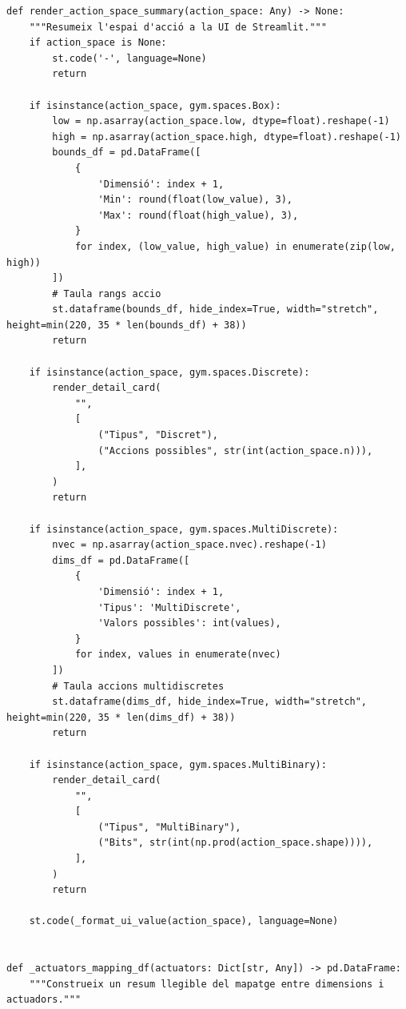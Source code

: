 \documentclass[10pt,a4paper]{article}
\begin{document}
\begin{lstlisting}[style=studioPython,caption={pages/Mostrar\_Entorn.py},label={lst:pages-mostrar-entorn-py}]
def render_action_space_summary(action_space: Any) -> None:
    """Resumeix l'espai d'acció a la UI de Streamlit."""
    if action_space is None:
        st.code('-', language=None)
        return

    if isinstance(action_space, gym.spaces.Box):
        low = np.asarray(action_space.low, dtype=float).reshape(-1)
        high = np.asarray(action_space.high, dtype=float).reshape(-1)
        bounds_df = pd.DataFrame([
            {
                'Dimensió': index + 1,
                'Min': round(float(low_value), 3),
                'Max': round(float(high_value), 3),
            }
            for index, (low_value, high_value) in enumerate(zip(low, high))
        ])
        # Taula rangs accio
        st.dataframe(bounds_df, hide_index=True, width="stretch", height=min(220, 35 * len(bounds_df) + 38))
        return

    if isinstance(action_space, gym.spaces.Discrete):
        render_detail_card(
            "",
            [
                ("Tipus", "Discret"),
                ("Accions possibles", str(int(action_space.n))),
            ],
        )
        return

    if isinstance(action_space, gym.spaces.MultiDiscrete):
        nvec = np.asarray(action_space.nvec).reshape(-1)
        dims_df = pd.DataFrame([
            {
                'Dimensió': index + 1,
                'Tipus': 'MultiDiscrete',
                'Valors possibles': int(values),
            }
            for index, values in enumerate(nvec)
        ])
        # Taula accions multidiscretes
        st.dataframe(dims_df, hide_index=True, width="stretch", height=min(220, 35 * len(dims_df) + 38))
        return

    if isinstance(action_space, gym.spaces.MultiBinary):
        render_detail_card(
            "",
            [
                ("Tipus", "MultiBinary"),
                ("Bits", str(int(np.prod(action_space.shape)))),
            ],
        )
        return

    st.code(_format_ui_value(action_space), language=None)


def _actuators_mapping_df(actuators: Dict[str, Any]) -> pd.DataFrame:
    """Construeix un resum llegible del mapatge entre dimensions i actuadors."""


\end{lstlisting}
\end{document}
